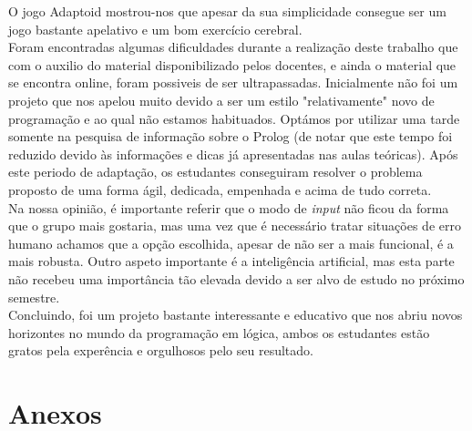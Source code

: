 \documentclass[a4paper]{article}
\begin{document}
O jogo Adaptoid mostrou-nos que apesar da sua simplicidade consegue ser um jogo bastante apelativo e um bom exercício cerebral.
\\

Foram encontradas algumas dificuldades durante a realização deste trabalho que com o auxilio do material disponibilizado pelos docentes, e ainda o material que se encontra online, foram possiveis de ser ultrapassadas. Inicialmente não foi um projeto que nos apelou muito devido a ser um estilo "relativamente" novo de programação e ao qual não estamos habituados. Optámos por utilizar uma tarde somente na pesquisa de informação sobre o Prolog (de notar que este tempo foi reduzido devido às informações e dicas já apresentadas nas aulas teóricas). Após este periodo de adaptação, os estudantes conseguiram resolver o problema proposto de uma forma ágil, dedicada, empenhada e acima de tudo correta.
\\

Na nossa opinião, é importante referir que o modo de \textit{input} não ficou da forma que o grupo mais gostaria, mas uma vez que é necessário tratar situações de erro humano achamos que a opção escolhida, apesar de não ser a mais funcional, é a mais robusta. Outro aspeto importante é a inteligência artificial, mas esta parte não recebeu uma importância tão elevada devido a ser alvo de estudo no próximo semestre.
\\

Concluindo, foi um projeto bastante interessante e educativo que nos abriu novos horizontes no mundo da programação em lógica, ambos os estudantes estão gratos pela experência e orgulhosos pelo seu resultado.

\clearpage

\nocite{*}
\renewcommand\refname{Bibliografia}

{}

\newpage
\appendix
\section{Anexos}
\end{document}
